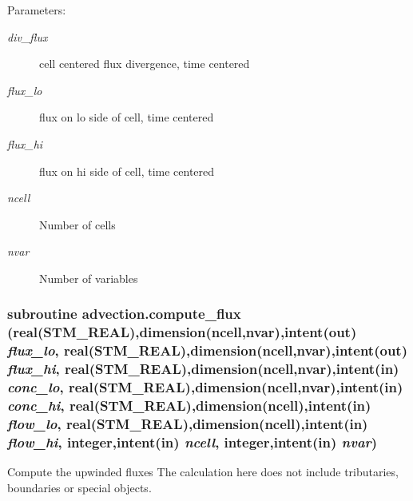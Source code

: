 \begin{Desc}
\item[Parameters:]
\begin{description}
\item[{\em div\_\-flux}]cell centered flux divergence, time centered\item[{\em flux\_\-lo}]flux on lo side of cell, time centered\item[{\em flux\_\-hi}]flux on hi side of cell, time centered \item[{\em ncell}]Number of cells\item[{\em nvar}]Number of variables \end{description}
\end{Desc}
\hypertarget{a00026_3947a8a29b1c666b2d1b7223215e9873}{
\subsubsection[{compute\_\-flux}]{\setlength{\rightskip}{0pt plus 5cm}subroutine advection.compute\_\-flux (real(STM\_\-REAL),dimension(ncell,nvar),intent(out) {\em flux\_\-lo}, \/  real(STM\_\-REAL),dimension(ncell,nvar),intent(out) {\em flux\_\-hi}, \/  real(STM\_\-REAL),dimension(ncell,nvar),intent(in) {\em conc\_\-lo}, \/  real(STM\_\-REAL),dimension(ncell,nvar),intent(in) {\em conc\_\-hi}, \/  real(STM\_\-REAL),dimension(ncell),intent(in) {\em flow\_\-lo}, \/  real(STM\_\-REAL),dimension(ncell),intent(in) {\em flow\_\-hi}, \/  integer,intent(in) {\em ncell}, \/  integer,intent(in) {\em nvar})}}
\label{a00026_3947a8a29b1c666b2d1b7223215e9873}


Compute the upwinded fluxes The calculation here does not include tributaries, boundaries or special objects. 

